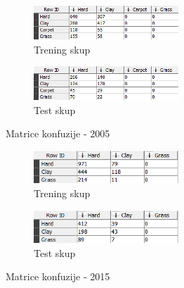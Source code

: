 \documentclass[a4paper]{article}
\begin{document}
\begin{figure}[H]
	\begin{subfigure}[h]{\textwidth}
		\begin{center}
			\includegraphics[width=0.6\textwidth]{Klasifikacija/DrvoOdlucivanja/2005/MatricaKonfuzijeTrening.png}
		\end{center}
		\caption{Trening skup}
		\label{fig:MatricaKnfuzijeTrening2005}
	\end{subfigure}

	\vspace{0.5cm}
	\begin{subfigure}[h]{\textwidth}
		\begin{center}
			\includegraphics[width=0.6\textwidth]{Klasifikacija/DrvoOdlucivanja/2005/MatricaKonfuzijeTest.png}
		\end{center}
		\caption{Test skup}
		\label{fig:MatricaKnfuzijeTest2005}
	\end{subfigure}
	\caption{Matrice konfuzije - 2005}
	\label{fig:MatricaKnfuzije2005}
\end{figure}

\begin{figure}[H]
	\begin{subfigure}[h]{\textwidth}
		\begin{center}
			\includegraphics[width=0.6\textwidth]{Klasifikacija/DrvoOdlucivanja/2015/MatricaKonfuzijeTrening.png}
		\end{center}
		\caption{Trening skup}
		\label{fig:MatricaKnfuzijeTrening2015}
	\end{subfigure}

	\vspace{0.5cm}
	\begin{subfigure}[h]{\textwidth}
		\begin{center}
			\includegraphics[width=0.6\textwidth]{Klasifikacija/DrvoOdlucivanja/2015/MatricaKonfuzijeTest.png}
		\end{center}
		\caption{Test skup}
		\label{fig:MatricaKnfuzijeTest2015}
	\end{subfigure}
	\caption{Matrice konfuzije - 2015}
	\label{fig:MatricaKnfuzije2015}
\end{figure}
\end{document}
